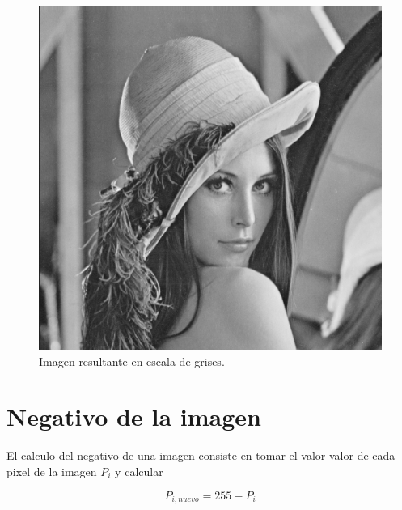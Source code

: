\begin{figure}[H]
	\centering
	\includegraphics[scale=0.5]{imagenes/lennaGrisValores.png}
	\caption{Imagen resultante en escala de grises\label{fig:paleta}.}
\end{figure}

\section{Negativo de la imagen}

El calculo del negativo de una imagen consiste en tomar el valor valor de cada pixel de la imagen $P_i$ y calcular

\begin{equation}
P_{i,nuevo}=255-P_i
\end{equation}

